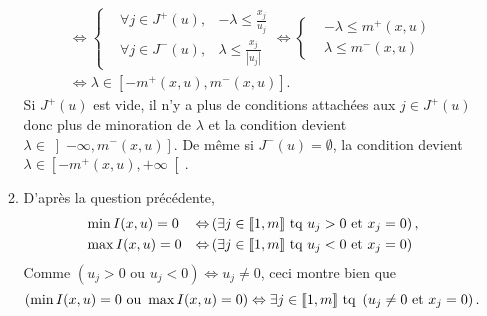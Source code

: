 \begin{enumerate}
\begin{enumerate}
\begin{multline*}
  \Leftrightarrow
    \left\lbrace
  \begin{aligned}
    &\forall j \in J^+(u),& -\lambda \leq  \frac{x_j}{u_j}\\
    &\forall j \in J^-(u),& \lambda \leq \frac{x_j}{|u_j|}
  \end{aligned}
  \right. 
  \Leftrightarrow
    \left\lbrace
  \begin{aligned}
    & -\lambda \leq  m^+(x,u)\\
    & \lambda \leq m^-(x,u)
  \end{aligned}
  \right. \\
  \Leftrightarrow \lambda \in \left[ -m^+(x,u), m^-(x,u)\right] .
\end{multline*}
Si $J^+(u)$ est vide, il n'y a plus de conditions attachées aux $j\in J^+(u)$ donc plus de minoration de $\lambda$ et la condition devient $\lambda \in \left] - \infty, m^-(x,u) \right]$. De même si $J^-(u)=\emptyset$, la condition devient $\lambda \in\left[ -m^+(x,u), +\infty \right[$.
    \item D'après la question précédente,
\[
\begin{aligned}
  &\min I(x,u) = 0 &\Leftrightarrow& \left( \exists j \in \llbracket 1 , m \rrbracket \text{ tq } u_j >0 \text{ et } x_j = 0\right), \\
  &\max I(x,u) = 0 &\Leftrightarrow& \left( \exists j \in \llbracket 1 , m \rrbracket \text{ tq } u_j <0 \text{ et } x_j = 0\right)
\end{aligned}
\]
Comme $\left( u_j >0 \text{ ou } u_j < 0\right) \Leftrightarrow u_j \neq 0$, ceci montre bien que 
\[
  \left( \min I(x,u) = 0 \text{ ou } \max I(x,u) = 0\right) \Leftrightarrow \exists j \in \llbracket 1 , m \rrbracket \text{ tq } \left( u_j \neq 0 \text{ et } x_j = 0 \right).
\]
  \end{enumerate}
\end{enumerate}

